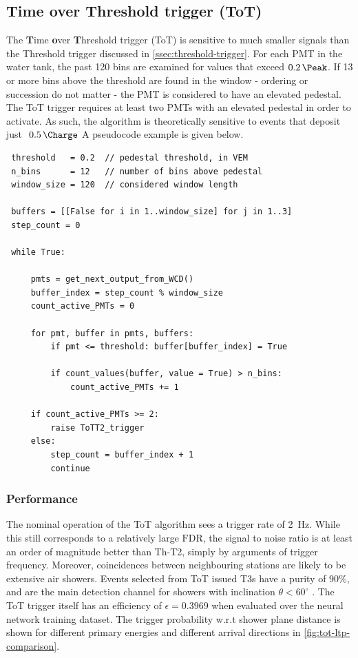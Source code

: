 \subsection{Time over Threshold trigger (ToT)}
\label{ssec:time-over-threshold-trigger}

The \textbf{T}ime \textbf{o}ver \textbf{T}hreshold trigger (ToT) is sensitive to much smaller signals than the Threshold trigger discussed in 
\autoref{ssec:threshold-trigger}. For each PMT in the water tank, the past 120 bins are examined for values that exceed $\SI{0.2}{\Peak}$. If 13 or more bins
above the threshold are found in the window - ordering or succession do not matter - the PMT is considered to have an elevated pedestal. The ToT trigger requires
at least two PMTs with an elevated pedestal in order to activate. As such, the algorithm is theoretically sensitive to events that deposit just $~\SI{0.5}{\Charge}$ 
A pseudocode example is given below.

\begin{lstlisting}
 threshold   = 0.2  // pedestal threshold, in VEM
 n_bins      = 12   // number of bins above pedestal
 window_size = 120  // considered window length

 buffers = [[False for i in 1..window_size] for j in 1..3] 
 step_count = 0

 while True:

     pmts = get_next_output_from_WCD()
     buffer_index = step_count % window_size
     count_active_PMTs = 0

     for pmt, buffer in pmts, buffers:
         if pmt <= threshold: buffer[buffer_index] = True

         if count_values(buffer, value = True) > n_bins:
             count_active_PMTs += 1

     if count_active_PMTs >= 2:
         raise ToTT2_trigger
     else:
         step_count = buffer_index + 1
         continue
\end{lstlisting}

\subsubsection{Performance}
\label{ssec:tot-performance}

The nominal operation of the ToT algorithm sees a trigger rate of \SI{2}{\hertz}. While this still corresponds to a relatively large $\text{FDR}$, the signal to 
noise ratio is at least an order of magnitude better than Th-T2, simply by arguments of trigger frequency. Moreover, coincidences between neighbouring stations are
likely to be extensive air showers. Events selected from ToT issued T3s have a purity of 90\%, and are the main detection channel for showers with inclination 
$\theta < 60^\circ$ \cite{abraham2010trigger}. The ToT trigger itself has an efficiency of $\epsilon = 0.3969$ when evaluated over the neural network training 
dataset. The trigger probability w.r.t shower plane distance is shown for different primary energies and different arrival directions in 
\autoref{fig:tot-ltp-comparison}.

